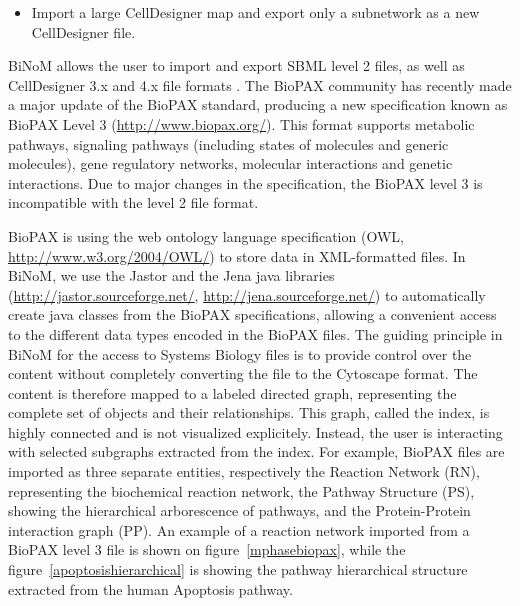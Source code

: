 \documentclass[10pt]{bmc_article}
\newenvironment{bmcformat}{\baselineskip20pt\sloppy\setboolean{publ}{false}}{\baselineskip20pt\sloppy}
\begin{document}
\begin{bmcformat}
\begin{itemize}
\item Import a large CellDesigner map and export only a subnetwork as a new CellDesigner file.  

\end{itemize}

BiNoM allows the user to import and export SBML level 2 files, as well as
CellDesigner 3.x and 4.x file formats \cite{zinovyev2008binom}. The BioPAX
community has recently made a major update of the BioPAX standard, producing a
new specification known as BioPAX Level 3 (\url{http://www.biopax.org/}). This
format supports metabolic pathways, signaling pathways (including states of molecules
and generic molecules), gene regulatory networks, molecular interactions and
genetic interactions. Due to major changes in the
specification, the BioPAX level 3 is incompatible with the level 2 file format.

BioPAX is using the web ontology language specification (OWL,
\url{http://www.w3.org/2004/OWL/}) to store data in XML-formatted files. In
BiNoM, we use the Jastor and the Jena java libraries
(\url{http://jastor.sourceforge.net/}, \url{http://jena.sourceforge.net/}) to
automatically create java classes from the BioPAX specifications, allowing a
convenient access to the different data types encoded in the BioPAX files. The
guiding principle in BiNoM for the
access to Systems Biology files is to provide control over the content without
completely converting the file to the Cytoscape format. The content is therefore
mapped to a labeled directed graph, representing the complete set of objects and
their relationships. This graph, called the index, is highly connected and is
not visualized explicitely. Instead, the user is interacting with selected subgraphs
extracted from the index. For example, BioPAX files are imported as three
separate entities, respectively the Reaction Network (RN), representing the
biochemical reaction network, the Pathway Structure (PS), showing the
hierarchical arborescence of pathways, and the Protein-Protein interaction graph
(PP). An example of a reaction network imported from a BioPAX level 3 file is
shown on figure~\ref{mphasebiopax}, while the figure~\ref{apoptosishierarchical}
is showing the pathway hierarchical
structure extracted from the human Apoptosis pathway.  



\end{bmcformat}
\end{document}

